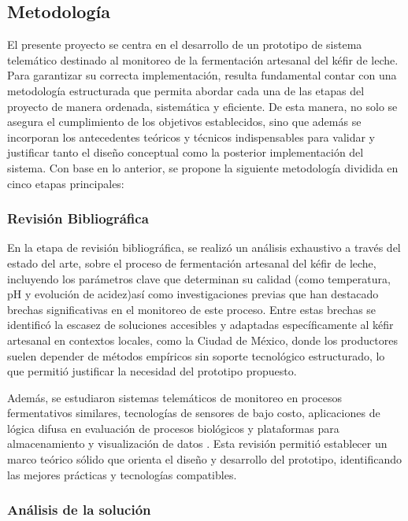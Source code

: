  \subsection{Metodología}
El presente proyecto se centra en el desarrollo de un prototipo de sistema telemático destinado
al monitoreo de la fermentación artesanal del kéfir de leche. Para garantizar 
su correcta implementación, resulta fundamental contar con una metodología 
estructurada que permita abordar cada una de las etapas del proyecto de manera ordenada, 
sistemática y eficiente. De esta manera, no solo se asegura el cumplimiento de los objetivos 
establecidos, sino que además se incorporan los antecedentes teóricos y técnicos indispensables 
para validar y justificar tanto el diseño conceptual como la posterior implementación del sistema.
Con base en lo anterior, se propone la siguiente metodología dividida en cinco etapas principales:

\subsubsection{Revisión Bibliográfica}

En la etapa de revisión bibliográfica, se realizó un análisis exhaustivo a través del estado del arte,
sobre el proceso de fermentación artesanal del kéfir de leche, incluyendo los parámetros clave 
que determinan su calidad (como temperatura, pH y evolución de acidez)así como investigaciones
previas que han destacado brechas significativas en el monitoreo de este proceso.
Entre estas brechas se identificó la escasez de soluciones accesibles y adaptadas específicamente 
al kéfir artesanal en contextos locales, como la Ciudad de México, donde los productores 
suelen depender de métodos empíricos sin soporte tecnológico estructurado, lo que permitió 
justificar la necesidad del prototipo propuesto.

Además, se estudiaron 
sistemas telemáticos de monitoreo en procesos fermentativos similares, tecnologías de sensores 
de bajo costo, aplicaciones de lógica difusa en evaluación de procesos biológicos y plataformas 
para almacenamiento y visualización de datos . 
Esta revisión permitió establecer un marco teórico sólido que orienta el diseño y 
desarrollo del prototipo, identificando las mejores prácticas y tecnologías compatibles.

\subsubsection{Análisis de la solución}

